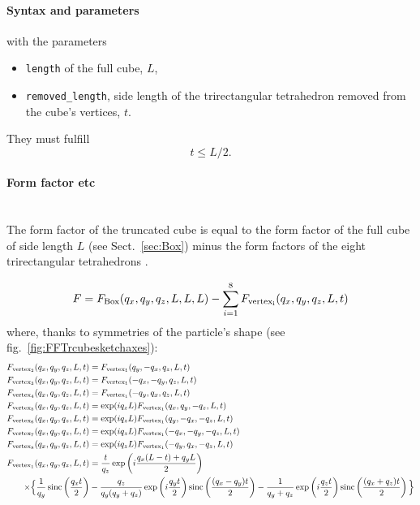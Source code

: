 \FloatBarrier

\paragraph{Syntax and parameters}
\begin{quote}
\end{quote}
with the parameters
\begin{itemize}
\item \texttt{length} of the full cube, $L$,
\item \texttt{removed\_length}, side length of the trirectangular tetrahedron removed from the cube's vertices, $t$.
\end{itemize}
They must fulfill
\begin{displaymath}
  t \le L/2.
\end{displaymath}


\paragraph{Form factor etc}\strut\\
The form factor of the truncated cube is equal to the form factor of the full cube of side length $L$ (see Sect.~\ref{sec:Box}) minus the form factors of the eight trirectangular tetrahedrons \cite{HeSS74}.

\begin{equation*}
F =F_{\rm{Box}}(q_x,q_y,q_z, L, L, L) - \sum_{i=1}^8 F_{\rm{vertex}_i}(q_x, q_y, q_z, L, t)
\end{equation*}
where, thanks to symmetries of the particle's shape (see fig.~\ref{fig:FFTrcubesketchaxes}):
\begin{align*}
F_{\rm{vertex}_2}(q_x, q_y, q_z, L, t) &= F_{\rm{vertex}_1}(q_y, -q_x, q_z, L, t) \\
F_{\rm{vertex}_3}(q_x, q_y, q_z, L, t) &= F_{\rm{vertex}_1}(-q_x, -q_y, q_z, L, t) \\
F_{\rm{vertex}_4}(q_x, q_y, q_z, L, t) &= F_{\rm{vertex}_1}(-q_y, q_x, q_z, L, t) \\
F_{\rm{vertex}_5}(q_x, q_y, q_z, L, t) &= \exp(iq_zL)F_{\rm{vertex}_1}(q_x, q_y, -q_z, L, t) \\
F_{\rm{vertex}_6}(q_x, q_y, q_z, L, t) &= \exp(iq_zL)F_{\rm{vertex}_1}(q_y, -q_x,- q_z, L, t) \\
F_{\rm{vertex}_7}(q_x, q_y, q_z, L, t) &= \exp(iq_zL)F_{\rm{vertex}_1}(-q_x, -q_y, -q_z, L, t) \\
F_{\rm{vertex}_8}(q_x, q_y, q_z, L, t) &= \exp(iq_zL)F_{\rm{vertex}_1}(-q_y, q_x, -q_z, L, t) \\
F_{\rm{vertex}_1}(q_x, q_y, q_z, L, t) &=\frac{t}{q_z}\exp\left( i\frac{q_x(L-t)+ q_y L}{2} \right) \\
\times \Big\{ \frac{1}{q_y} \operatorname{sinc}\left( \frac{q_x t}{2}\right) &- \frac{q_z}{q_y(q_y + q_z)} \exp\left(i\frac{q_yt}{2}\right) \operatorname{sinc}\left( \frac{(q_x-q_y)t}{2}\right) - \frac{1}{q_y + q_z} \exp\left( i\frac{q_z t}{2} \right) \operatorname{sinc} \left( \frac{(q_x+q_z) t}{2} \right)  \Big\}    
\end{align*}

